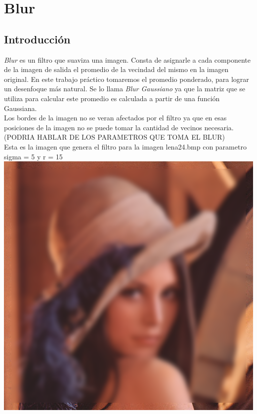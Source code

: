 \documentclass[10pt,a4paper,spanish]{article}
\begin{document}
\section{Blur}

\subsection{Introducción}

\textit{Blur} es un filtro que suaviza una imagen. Consta de asignarle a cada componente de la imagen de salida el promedio de la vecindad del mismo en la imagen original. En este trabajo práctico tomaremos el promedio ponderado, para lograr un desenfoque más natural. Se lo llama \textit{Blur Gaussiano} ya que la matriz que se utiliza para calcular este promedio es calculada a partir de una función Gaussiana. \\

Los bordes de la imagen no se veran afectados por el filtro ya que en esas posiciones de la imagen no se puede tomar la cantidad de vecinos necesaria. \\

(PODRIA HABLAR DE LOS PARAMETROS QUE TOMA EL BLUR) \\

Esta es la imagen que genera el filtro para la imagen lena24.bmp con parametro sigma = 5 y r = 15 \\

\includegraphics[keepaspectratio]{blur_lena24_5_15.png}
\end{document}
